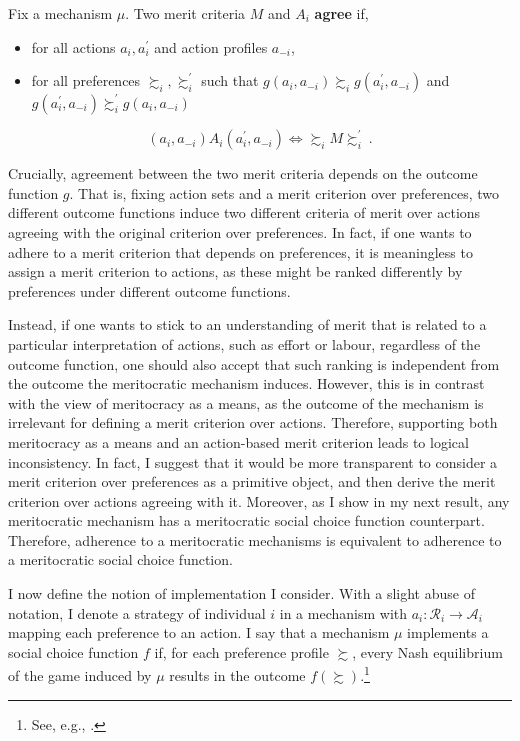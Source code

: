 \begin{definition}
	Fix a mechanism \( \mu \). Two merit criteria \( M \) and \( A_i \) \textbf{agree} if,
	\begin{itemize}
		\item for all actions \( a_i, a^{\prime}_{i} \) and action profiles \( a_{-i} \),
		\item for all preferences \( \succsim_i, \succsim_i^{\prime} \) such that \( g ( a_{i}, a_{-i} ) \succsim_i g ( a^{\prime}_{i}, a_{-i} ) \) and \( g ( a^{\prime}_{i}, a_{-i} ) \succsim_i^{\prime} g ( a_{i}, a_{-i} ) \)
	\end{itemize}

	\[ ( a_i, a_{-i} ) A_i ( a^{\prime}_i, a_{-i} ) \iff \succsim_i M \succsim_i^{\prime} \: . \]
\end{definition}

Crucially, agreement between the two merit criteria depends on the outcome function \( g \). That is, fixing action sets and a merit criterion over preferences, two different outcome functions induce two different criteria of merit over actions agreeing with the original criterion over preferences. In fact, if one wants to adhere to a merit criterion that depends on preferences, it is meaningless to assign a merit criterion to actions, as these might be ranked differently by preferences under different outcome functions.

Instead, if one wants to stick to an understanding of merit that is related to a particular interpretation of actions, such as effort or labour, regardless of the outcome function, one should also accept that such ranking is independent from the outcome the meritocratic mechanism induces. However, this is in contrast with the view of meritocracy as a means, as the outcome of the mechanism is irrelevant for defining a merit criterion over actions. Therefore, supporting both meritocracy as a means and an action-based merit criterion leads to logical inconsistency. In fact, I suggest that it would be more transparent to consider a merit criterion over preferences as a primitive object, and then derive the merit criterion over actions agreeing with it. Moreover, as I show in my next result, any meritocratic mechanism has a meritocratic social choice function counterpart. Therefore, adherence to a meritocratic mechanisms is equivalent to adherence to a meritocratic social choice function.

I now define the notion of implementation I consider. With a slight abuse of notation, I denote a strategy of individual \( i \) in a mechanism with \( a_{i} \colon \mathcal{R}_i \rightarrow \mathcal{A}_i \) mapping each preference to an action. I say that a mechanism \( \mu \) implements a social choice function \( f \) if, for each preference profile \( \succsim \), every Nash equilibrium of the game induced by \( \mu \) results in the outcome \( f ( \succsim ) \).\footnote{See, e.g., \citet[p. 913]{mas-colellMicroeconomicTheory1995}.}

